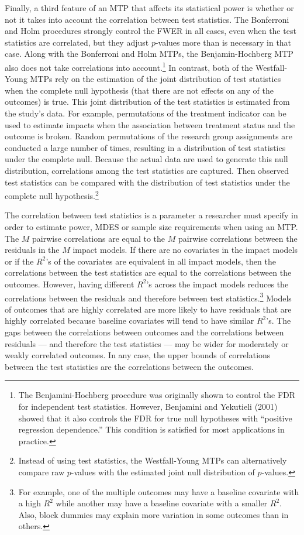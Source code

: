 \documentclass[
]{article}
\begin{document}
Finally, a third feature of an MTP that affects its statistical power is
whether or not it takes into account the correlation between test
statistics. The Bonferroni and Holm procedures strongly control the FWER
in all cases, even when the test statistics are correlated, but they
adjust \(p\)-values more than is necessary in that case. Along with the
Bonferroni and Holm MTPs, the Benjamin-Hochberg MTP also does not take
correlations into
account.\footnote{The Benjamini-Hochberg procedure was originally shown to control the FDR for independent test statistics. However, Benjamini and Yekutieli (2001) showed that it also controls the FDR for true null hypotheses with “positive regression dependence.” This condition is satisfied
for most applications in practice.} In contrast, both of the
Westfall-Young MTPs rely on the estimation of the joint distribution of
test statistics when the complete null hypothesis (that there are not
effects on any of the outcomes) is true. This joint distribution of the
test statistics is estimated from the study's data. For example,
permutations of the treatment indicator can be used to estimate impacts
when the association between treatment status and the outcome is broken.
Random permutations of the research group assignments are conducted a
large number of times, resulting in a distribution of test statistics
under the complete null. Because the actual data are used to generate
this null distribution, correlations among the test statistics are
captured. Then observed test statistics can be compared with the
distribution of test statistics under the complete null
hypothesis.\footnote{Instead of using test statistics, the Westfall-Young MTPs can alternatively compare raw $p$-values with the estimated joint null distribution of $p$-values.}

The correlation between test statistics is a parameter a researcher must
specify in order to estimate power, MDES or sample size requirements
when using an MTP. The \(M\) pairwise correlations are equal to the
\(M\) pairwise correlations between the residuals in the \(M\) impact
models. If there are no covariates in the impact models or if the
\(R^2\)'s of the covariates are equivalent in all impact models, then
the correlations between the test statistics are equal to the
correlations between the outcomes. However, having different \(R^2\)'s
across the impact models reduces the correlations between the residuals
and therefore between test
statistics.\footnote{For example, one of the multiple outcomes may have a baseline covariate with a high $R^2$ while another may have a baseline covariate with
a smaller $R^2$. Also, block dummies may explain more variation in some outcomes than in others.}
Models of outcomes that are highly correlated are more likely to have
residuals that are highly correlated because baseline covariates will
tend to have similar \(R^2\)'s. The gaps between the correlations
between outcomes and the correlations between residuals --- and
therefore the test statistics --- may be wider for moderately or weakly
correlated outcomes. In any case, the upper bounds of correlations
between the test statistics are the correlations between the outcomes.
\end{document}
